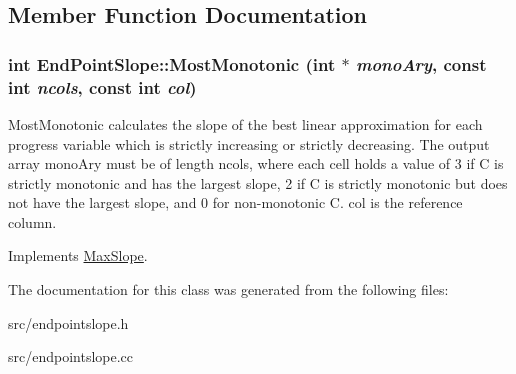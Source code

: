 \subsection{Member Function Documentation}
\hypertarget{classEndPointSlope_a70417721fe8a60669a67d19a7855bef5}{
\subsubsection[{MostMonotonic}]{\setlength{\rightskip}{0pt plus 5cm}int EndPointSlope::MostMonotonic (int $\ast$ {\em monoAry}, \/  const int {\em ncols}, \/  const int {\em col})}}
\label{da/d7d/classEndPointSlope_a70417721fe8a60669a67d19a7855bef5}
MostMonotonic calculates the slope of the best linear approximation for each progress variable which is strictly increasing or strictly decreasing. The output array monoAry must be of length ncols, where each cell holds a value of 3 if C is strictly monotonic and has the largest slope, 2 if C is strictly monotonic but does not have the largest slope, and 0 for non-\/monotonic C. col is the reference column. 

Implements \hyperlink{classMaxSlope}{MaxSlope}.

The documentation for this class was generated from the following files:\begin{DoxyCompactItemize}
\item 
src/endpointslope.h\item 
src/endpointslope.cc\end{DoxyCompactItemize}
